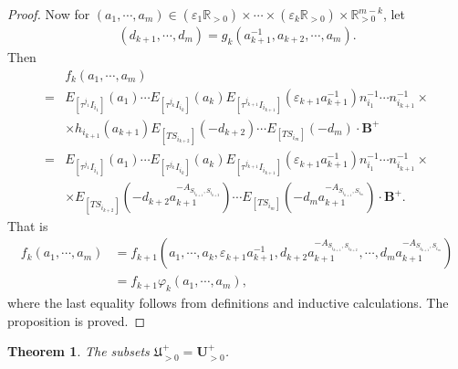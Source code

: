 \documentclass[12pt]{amsart}
\newtheorem{theorem}{Theorem}[section]
\begin{document}
\begin{proof}
    Now for $(a_1,\cdots,a_m)\in (\varepsilon_1\mathbb{R}_{>0})\times \cdots \times (\varepsilon_k\mathbb{R}_{>0})\times \mathbb{R}_{>0}^{m-k}$, let
    \begin{align*}
       (d_{k+1},\cdots,d_m)=g_k(a_{k+1}^{-1},a_{k+2},\cdots,a_m) .
    \end{align*}
     Then 
    \begin{align*}
    &f_k(a_1,\cdots,a_m)\\
    =&E_{[\tau^{j_1}I_{i_1}]}(a_1) \cdots E_{[\tau^{j_k}I_{i_k}]}(a_k) E_{[\tau^{j_{k+1}}I_{i_{k+1}}]}(\varepsilon_{k+1}a_{k+1}^{-1}) n_{i_1}^{-1}\cdots n_{i_{k+1}}^{-1}\times \\ 
    & \times h_{i_{k+1}}(a_{k+1})  E_{[TS_{i_{k+2}}]}(-d_{k+2}) \cdots E_{[TS_{i_m}]}(-d_m) \cdot \mathbf{B}^+\\
    =&E_{[\tau^{j_1}I_{i_1}]}(a_1) \cdots E_{[\tau^{j_k}I_{i_k}]}(a_k) E_{[\tau^{j_{k+1}}I_{i_{k+1}}]}(\varepsilon_{k+1}a_{k+1}^{-1}) n_{i_1}^{-1}\cdots n_{i_{k+1}}^{-1}\times \\ 
     & \times  E_{[TS_{i_{k+2}}]}(-d_{k+2}a_{k+1}^{-A_{S_{i_{k+1}},S_{i_{k+2}}}}) \cdots E_{[TS_{i_m}]}(-d_ma_{k+1}^{-A_{S_{i_{k+1}},S_{i_m}}}) \cdot \mathbf{B}^+.
    \end{align*}
    That is 
    \begin{align*}
        f_k(a_1,\cdots,a_m)&=f_{k+1}(a_1,\cdots,a_k,\varepsilon_{k+1}a_{k+1}^{-1},d_{k+2}a_{k+1}^{-A_{S_{i_{k+1}},S_{i_{k+2}}}},\cdots,d_ma_{k+1}^{-A_{S_{i_{k+1}},S_{i_m}}})\\
        &=f_{k+1}\varphi_k(a_1,\cdots,a_m),
    \end{align*}
    where the last equality follows from definitions and inductive calculations. 
    The proposition is proved.
\end{proof}


\begin{theorem}\label{u=u}
    The subsets 
    $\mathfrak{U}^+_{>0}=\mathbf{U}^+_{>0}$.
\end{theorem}
\end{document}
